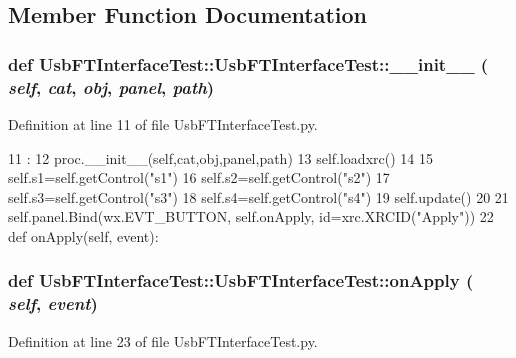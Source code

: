 \subsection{Member Function Documentation}
\hypertarget{classUsbFTInterfaceTest_1_1UsbFTInterfaceTest_ad11b06306755615ca3c5f772e5d0f424}{
\subsubsection[{\_\-\_\-init\_\-\_\-}]{\setlength{\rightskip}{0pt plus 5cm}def UsbFTInterfaceTest::UsbFTInterfaceTest::\_\-\_\-init\_\-\_\- ( {\em self}, \/   {\em cat}, \/   {\em obj}, \/   {\em panel}, \/   {\em path})}}
\label{classUsbFTInterfaceTest_1_1UsbFTInterfaceTest_ad11b06306755615ca3c5f772e5d0f424}


Definition at line 11 of file UsbFTInterfaceTest.py.


\begin{DoxyCode}
11                                              :
12         proc.__init__(self,cat,obj,panel,path)
13         self.loadxrc()
14 
15         self.s1=self.getControl("s1")
16         self.s2=self.getControl("s2")
17         self.s3=self.getControl("s3")
18         self.s4=self.getControl("s4")
19         self.update()
20 
21         self.panel.Bind(wx.EVT_BUTTON, self.onApply, id=xrc.XRCID("Apply"))
22 
    def onApply(self, event):
\end{DoxyCode}
\hypertarget{classUsbFTInterfaceTest_1_1UsbFTInterfaceTest_a1c0d9fa0a23a621bd47e42509822980b}{
\subsubsection[{onApply}]{\setlength{\rightskip}{0pt plus 5cm}def UsbFTInterfaceTest::UsbFTInterfaceTest::onApply ( {\em self}, \/   {\em event})}}
\label{classUsbFTInterfaceTest_1_1UsbFTInterfaceTest_a1c0d9fa0a23a621bd47e42509822980b}


Definition at line 23 of file UsbFTInterfaceTest.py.



